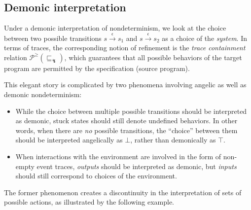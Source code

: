 \documentclass[11pt,oneside,draft]{book}
\theoremstyle{definition}
\newcommand{\refby}{\sqsubseteq} %
\begin{document}
\subsection{Demonic interpretation} %

Under a demonic interpretation of nondeterminism,
we look at the choice between two possible transitions
$s \stackrel{\epsilon}{\rightarrow} s_1$ and
$s \stackrel{\epsilon}{\rightarrow} s_2$
as a choice of the \emph{system}.
In terms of traces,
the corresponding notion of refinement
is the \emph{trace containment} relation
$\mathcal{P}^\ge({\refby_\lightning})$,
which guarantees that all possible behaviors of the target program
are permitted by the specification (source program).

This elegant story is complicated by two phenomena
involving angelic as well as demonic nondeterminism:
\begin{itemize}
  \item
    While the choice between multiple possible transitions
    should be interpreted as demonic,
    stuck states should still denote undefined behaviors.
    In other words,
    when there are \emph{no} possible transitions,
    the ``choice'' between them should be interpreted
    angelically as $\bot$,
    rather than demonically as $\top$.
  \item
    When interactions with the environment are involved
    in the form of non-empty event traces,
    \emph{outputs} should be interpreted as demonic,
    but \emph{inputs} should still correspond to
    choices of the environment.
\end{itemize}
The former phenomenon creates a discontinuity
in the interpretation of sets of possible actions,
as illustrated by the following example.
\end{document}
